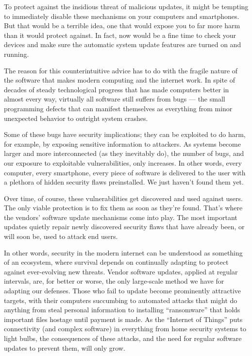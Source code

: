 To protect against the insidious threat of malicious updates, it might
be tempting to immediately disable these mechanisms on your computers
and smartphones. But that would be a terrible idea, one that would
expose you to far more harm than it would protect against. In fact, now
would be a fine time to check your devices and make sure the automatic
system update features are turned on and running.

The reason for this counterintuitive advice has to do with the fragile
nature of the software that makes modern computing and the internet
work. In spite of decades of steady technological progress that has made
computers better in almost every way, virtually all software still
suffers from bugs --- the small programming defects that can manifest
themselves as everything from minor unexpected behavior to outright
system crashes.

Some of these bugs have security implications; they can be exploited to
do harm, for example, by exposing sensitive information to attackers. As
systems become larger and more interconnected (as they inevitably do),
the number of bugs, and our exposure to exploitable vulnerabilities,
only increases. In other words, every computer, every smartphone, every
piece of software is delivered to the user with a plethora of hidden
security flaws preinstalled. We just haven't found them yet.

Over time, of course, these vulnerabilities get discovered and used
against users. The only viable protection is to fix them as soon as
they're found. That's where the vendors' software update mechanisms come
into play. The most important updates quietly repair newly discovered
security flaws that have already been, or will soon be, used to attack
end users.

In other words, security in the modern internet can be understood as
something of an ecosystem, where survival depends on continually
adapting to protect against ever-evolving new threats. Vendor software
updates, applied at regular intervals, are, for better or worse, the
only large-scale method we have for adapting our defenses. Those who
fail to update become prominently attractive targets, with their
computers succumbing to automated attacks that might do anything from
steal personal information to installing ``ransomware'' that holds
important files hostage until payment is made. As the ``Internet of
Things'' puts connectivity (and complex software) in everything from
home security systems to light bulbs, the consequences of these attacks,
and the need for regular software updates to prevent them, will only
grow.

